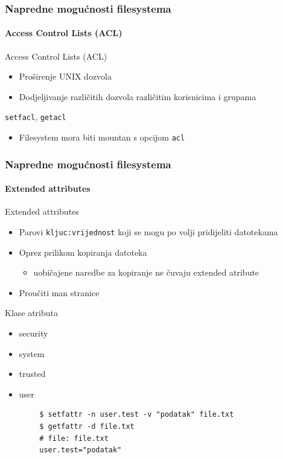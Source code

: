 \documentclass[t]{beamer}
\begin{document}
\begin{frame}
	\frametitle{Napredne mogućnosti filesystema}
	\framesubtitle{Access Control Lists (ACL)}
	Access Control Lists (ACL)
	\begin{itemize}
		\item Proširenje UNIX dozvola
		\item Dodjeljivanje različitih dozvola različitim korisnicima i grupama
	\end{itemize}
	\vspace{1em}
	\texttt{setfacl}, \texttt{getacl}
	\vspace{1em}
	\begin{itemize}
		\item Filesystem mora biti mountan s opcijom \texttt{acl}
	\end{itemize}
\end{frame}

\begin{frame}[fragile]
	\frametitle{Napredne mogućnosti filesystema}
	\framesubtitle{Extended attributes}
	Extended attributes
	\begin{itemize}
		\item Parovi \texttt{kljuc:vrijednost} koji se mogu po volji pridijeliti datotekama
		\item Oprez prilikom kopiranja datoteka
		\begin{itemize} 
			\item uobičajene naredbe za kopiranje ne čuvaju extended atribute
		\end{itemize}
		\item Proučiti man stranice
	\end{itemize}
	Klase atributa
	\begin{multicols}{2}
		\begin{itemize}
			\item security
			\item system
			\item trusted
			\item user
		\end{itemize}
	\end{multicols}
	{\footnotesize \begin{verbatim}
		$ setfattr -n user.test -v "podatak" file.txt
		$ getfattr -d file.txt
		# file: file.txt
		user.test="podatak"
		\end{verbatim}}
\end{frame}
\end{document}
